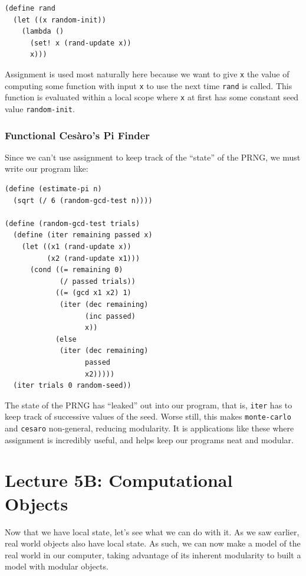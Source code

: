 \documentclass[9pt]{report}
\begin{document}
\begin{verbatim}
(define rand
  (let ((x random-init))
    (lambda ()
      (set! x (rand-update x))
      x)))
\end{verbatim}

Assignment is used most naturally here because we want to give \texttt{x}
the value of computing some function with input \texttt{x} to use the
next time \texttt{rand} is called. This function is evaluated within a
local scope where \texttt{x} at first has some constant seed value
\texttt{random-init}.


\subsection{Functional Cesàro's Pi Finder}
\label{sec:org1cf6a15}

Since we can't use assignment to keep track of the ``state'' of the
PRNG, we must write our program like:

\begin{verbatim}
(define (estimate-pi n)
  (sqrt (/ 6 (random-gcd-test n))))

(define (random-gcd-test trials)
  (define (iter remaining passed x)
    (let ((x1 (rand-update x))
          (x2 (rand-update x1)))
      (cond ((= remaining 0)
             (/ passed trials))
            ((= (gcd x1 x2) 1)
             (iter (dec remaining)
                   (inc passed)
                   x))
            (else
             (iter (dec remaining)
                   passed
                   x2)))))
  (iter trials 0 random-seed))
\end{verbatim}

The state of the PRNG has ``leaked'' out into our program, that is,
\texttt{iter} has to keep track of successive values of the seed. Worse
still, this makes \texttt{monte-carlo} and \texttt{cesaro} non-general, reducing
modularity. It is applications like these where assignment is
incredibly useful, and helps keep our programs neat and modular.

\chapter{Lecture 5B: Computational Objects}
\label{sec:org4aae96a}

Now that we have local state, let's see what we can do with it. As
we saw earlier, real world objects also have local state. As such,
we can now make a model of the real world in our computer, taking
advantage of its inherent modularity to built a model with modular
objects.
\end{document}
